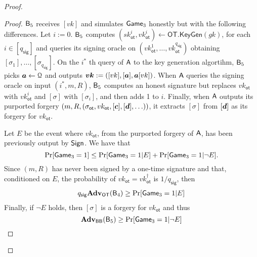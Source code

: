 \begin{proof}
\begin{proof}
$\mathsf{B}_5$ receives $[vk]$ and simulates $\mathsf{Game}_3$ honestly but with the following differences. Let $i:=0$. $\mathsf{B}_5$ computes $(sk_\mathsf{ot}^i,vk_\mathsf{ot}^i)\gets\mathsf{OT}.\mathsf{KeyGen}(gk)$, for each $i\in[q_\mathsf{sig}]$ and queries its signing oracle on $(vk_{\mathsf{ot}}^1,\ldots,vk_\mathsf{ot}^{q_{\mathsf{sig}}})$ obtaining $[\sigma_1],\ldots,[\sigma_{q_\mathsf{sig}}]$. On the $i^*$ th query of $\mathsf{A}$ to the key generation algortihm, $\mathsf{B}_5$ picks ${\boldsymbol{a}}\gets\mathcal{Q}$ and outputs ${\boldsymbol{vk}}:=([vk],[{\boldsymbol{a}}],{\boldsymbol{a}}[vk])$. When $\mathsf{A}$ queries the signing oracle on input $(i^*,m,R)$, $\mathsf{B}_5$ computes an honest signature but replaces $vk_\mathsf{ot}$ with $vk_\mathsf{ot}^i$ and $[\sigma]$ with $[\sigma_i]$, and then adds 1 to $i$. Finally, when $\mathsf{A}$ outputs its purported forgery $(m,R,(\sigma_\mathsf{ot},vk_\mathsf{ot},[{\boldsymbol{c}}],[{\boldsymbol{d}}],\ldots))$, it extracts $[\sigma]$ from $[{\boldsymbol{d}}]$ as its forgery for $vk_\mathsf{ot}$.

Let $E$ be the event where $vk_\mathsf{ot}$, from the purported forgery of $\mathsf{A}$, has been previously output by $\mathsf{Sign}$. We have that
$$
\Pr[\mathsf{Game}_3=1]\leq \Pr[\mathsf{Game}_3=1|E]+\Pr[\mathsf{Game}_3=1|\neg E].
$$
Since  $(m,R)$ has never been signed by a one-time signature and that, conditioned on $E$, the probability of $vk_\mathsf{ot}=vk_\mathsf{ot}^\dag$ is $1/q_\mathsf{sig}$, then
\begin{align*}
q_{\mathsf{sig}}\mathbf{Adv}_\mathsf{OT}(\mathsf{B}_4)\geq  \Pr[\mathsf{Game}_3=1|E]
\end{align*}
Finally, if $\neg E$ holds, then $[\sigma]$ is a forgery for $vk_\mathsf{ot}$ and thus
$$
\mathbf{Adv}_{\mathsf{BB}}(\mathsf{B}_5)\geq \Pr[\mathsf{Game}_3=1|\neg E]$$
\end{proof}
\end{proof}
